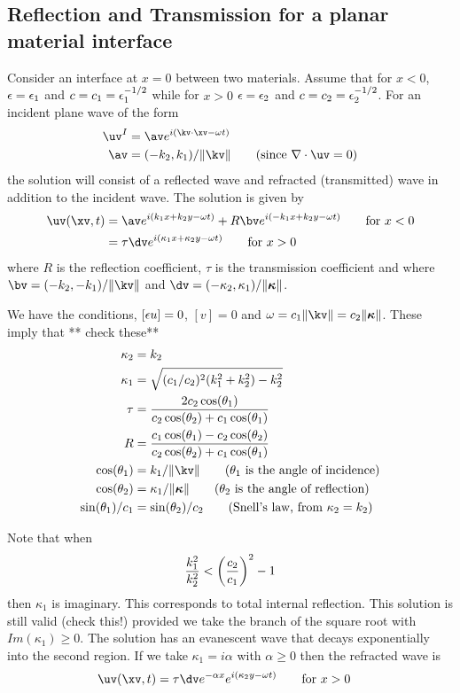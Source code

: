 \clearpage
\subsection{Reflection and Transmission for a planar material interface}


Consider an interface at $x=0$ between two materials.
Assume that for $x<0$, $\epsilon=\epsilon_1$ and $c=c_1=\epsilon_1^{-1/2}$ while for $x>0$ 
$\epsilon=\epsilon_2$ and $c=c_2=\epsilon_2^{-1/2}$.
For an incident plane wave
of the form
\begin{align*}
     \uv^I &= \av e^{ i (\kv\cdot\xv - \omega t)} \\
      \av &= (-k_2,k_1)/\| \kv \| \qquad\mbox{(since $\grad\cdot\uv=0$)}
\end{align*}
the solution will consist of a reflected wave and refracted (transmitted) wave in addition to the incident wave.
The solution is given by
\begin{align*}
  \uv(\xv,t) &= \av e^{ i (k_1 x + k_2 y - \omega t) } + R \bv e^{ i (-k_1 x + k_2 y - \omega t)} 
                                                                     \qquad\mbox{for $x<0$} \\
             &= \tau \dv e^{ i (\kappa_1 x + \kappa_2 y - \omega t)} \qquad\mbox{for $x>0$}
\end{align*}
where $R$ is the reflection coefficient, $\tau$ is the transmission coefficient and 
where $\bv=(-k_2,-k_1)/\| \kv \| $ and $\dv=(-\kappa_2,\kappa_1)/\| \kappav \|$.

We have the conditions, $[\epsilon u]=0$, $[v]=0$ and $\omega=c_1 \|\kv\|=c_2\|\kappav\|$.
These imply that ** check these**
\begin{align*}
   \kappa_2 &= k_2 \\
   \kappa_1 &= \sqrt{ (c_1/c_2)^2 (k_1^2+k_2^2) - k_2^2 } \\
   \tau &= { 2 c_2 \cos(\theta_1) \over c_2 \cos(\theta_2) + c_1 \cos(\theta_1) } \\
   R &= { c_1 \cos(\theta_1) - c_2 \cos(\theta_2) \over c_2 \cos(\theta_2) + c_1 \cos(\theta_1) } \\
   \cos(\theta_1) & = k_1/\|\kv\| \qquad\mbox{($\theta_1$ is the angle of incidence)} \\
  \cos(\theta_2) & = \kappa_1/\|\kappav\| \qquad\mbox{($\theta_2$ is the angle of reflection)} \\
   \sin(\theta_1)/c_1 &= \sin(\theta_2)/c_2 \qquad\mbox{(Snell's law, from $\kappa_2 = k_2$)}
\end{align*}  


Note that when
\[
     {k_1^2\over k_2^2} < \left({c_2\over c_1}\right)^2 - 1 
\]
then $\kappa_1$ is imaginary. This corresponds to total internal reflection.
This solution is still valid (check this!) provided we take the branch 
of the square root with $Im(\kappa_1)\ge 0$. The solution has an evanescent wave that decays
exponentially into the second region. If we take  $\kappa_1=i\alpha$ with $\alpha\ge 0$
then the refracted wave is 
\begin{align*}
  \uv(\xv,t) &= \tau \dv e^{-\alpha x} e^{ i (\kappa_2 y - \omega t)} \qquad\mbox{for $x>0$}
\end{align*}
